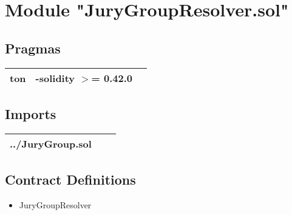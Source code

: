 
\section{Module "JuryGroupResolver.sol"}


\subsection{Pragmas}


\noindent\begin{tabular}{|l|l|p{5cm}|}\hline
ton & -solidity $>$= 0.42.0 &\\\hline
\end{tabular}


\subsection{Imports}


\noindent\begin{tabular}{|l|l|p{5cm}|}\hline
../JuryGroup.sol &\\\hline
\end{tabular}


\subsection{Contract Definitions}

\begin{itemize}
\item JuryGroupResolver
\end{itemize}
